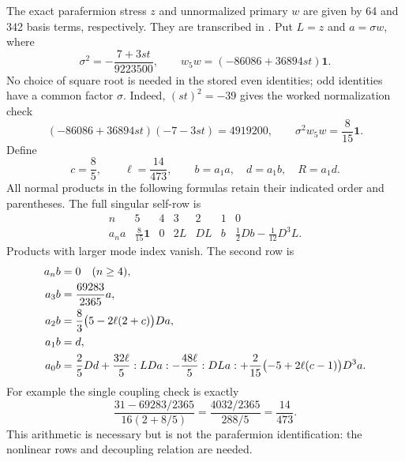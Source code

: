 The exact parafermion stress $z$ and unnormalized primary $w$ are
given by 64 and 342 basis terms, respectively. They are transcribed
in . Put $L=z$ and $a=\sigma w$, where
\[
 \sigma^2=-\frac{7+3st}{9223500},\qquad
 w_5w=(-86086+36894st)\mathbf1.
\]
No choice of square root is needed in the stored even identities;
odd identities have a common factor $\sigma$. Indeed, $(st)^2=-39$
gives the worked normalization check
\[
 (-86086+36894st)(-7-3st)=4919200,
 \qquad \sigma^2w_5w=\frac8{15}\mathbf1.
\]
Define
\[
 c=\frac85,\qquad \ell=\frac{14}{473},\qquad
 b=a_1a,\quad d=a_1b,\quad R=a_1d.
\]
All normal products in the following formulas retain their indicated
order and parentheses. The full singular self-row is
\begin{equation}
\begin{array}{c|rrrrrr}
 n&5&4&3&2&1&0\\\hline
 a_na&\frac8{15}\mathbf1&0&2L&DL&b&
       \frac12Db-\frac1{12}D^3L .
\end{array}
\label{hr:pf-selfrow}
\end{equation}
Products with larger mode index vanish. The second row is
\begin{align}
 a_nb&=0\quad(n\geq4),\notag\\
 a_3b&=\frac{69283}{2365}a,\notag\\
 a_2b&=\frac83\bigl(5-2\ell(2+c)\bigr)Da,\notag\\
 a_1b&=d,\notag\\
 a_0b&=\frac25Dd+\frac{32\ell}{5}:LDa:
          -\frac{48\ell}{5}:DLa:
          +\frac2{15}\bigl(-5+2\ell(c-1)\bigr)D^3a.
 \label{hr:pf-ab}
\end{align}
For example the single coupling check is exactly
\[
 \frac{31-69283/2365}{16(2+8/5)}
 =\frac{4032/2365}{288/5}=\frac{14}{473}.
\]
This arithmetic is necessary but is not the parafermion
identification: the nonlinear rows and decoupling relation are needed.

